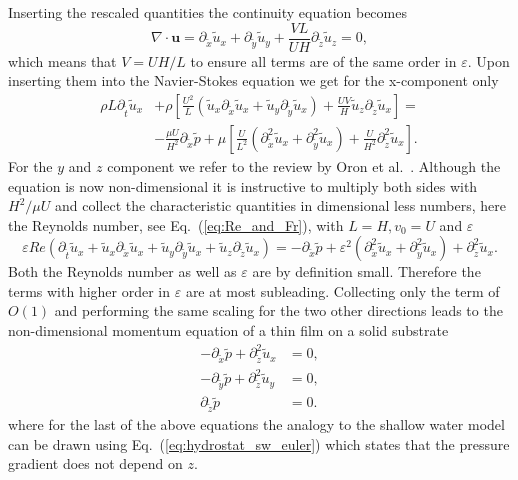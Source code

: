 Inserting the rescaled quantities the continuity equation becomes
\begin{equation}\label{eq:cont_thin_film_1}
     \nabla\cdot\mathbf{u} = \partial_{\tilde{x}} \tilde{u}_x + \partial_{\tilde{y}} \tilde{u}_y + \frac{V L}{U H}\partial_{\tilde{z}} \tilde{u}_z = 0,
\end{equation}
which means that $V = U H/L$ to ensure all terms are of the same order in $\varepsilon$.
Upon inserting them into the Navier-Stokes equation we get for the x-component only
\begin{align}
     \rho L \partial_{\tilde{t}}\tilde{u}_x &+ \rho\left[\frac{U^2}{L}\left(\tilde{u}_x\partial_{\tilde{x}}\tilde{u}_x + \tilde{u}_y\partial_{\tilde{y}}\tilde{u}_x\right) + \frac{U V}{H}\tilde{u}_z\partial_{\tilde{z}}\tilde{u}_x\right] = \nonumber \\ &-\frac{\mu U}{H^2} \partial_{\tilde{x}} \tilde{p} + \mu\left[\frac{U}{L^2}(\partial^2_{\tilde{x}}\tilde{u}_x + \partial^2_{\tilde{y}}\tilde{u}_x) + \frac{U}{H^2}\partial^2_{\tilde{z}}\tilde{u}_x\right].
\end{align}
For the $y$ and $z$ component we refer to the review by Oron et al.~\cite{RevModPhys.69.931}.
Although the equation is now non-dimensional it is instructive to multiply both sides with $H^2/\mu U$ and collect the characteristic quantities in dimensional less numbers, here the Reynolds number, see Eq.~(\ref{eq:Re_and_Fr}), with $L = H, v_0 = U$ and $\varepsilon$  
\begin{equation}
    \varepsilon Re \left(\partial_{\tilde{t}}\tilde{u}_x + \tilde{u}_x\partial_{\tilde{x}}\tilde{u}_x + \tilde{u}_y\partial_{\tilde{y}}\tilde{u}_x + \tilde{u}_z\partial_{\tilde{z}}\tilde{u}_x \right) = -\partial_{\tilde{x}}\tilde{p} + \varepsilon^2\left(\partial^2_{\tilde{x}}\tilde{u}_x + \partial^2_{\tilde{y}}\tilde{u}_x\right) + \partial^2_{\tilde{z}}\tilde{u}_x. 
\end{equation}
Both the Reynolds number as well as $\varepsilon$ are by definition small. 
Therefore the terms with higher order in $\varepsilon$ are at most subleading.
Collecting only the term of $O(1)$ and performing the same scaling for the two other directions leads to the non-dimensional momentum equation of a thin film on a solid substrate
\begin{align}
    -\partial_{\tilde{x}}\tilde{p} + \partial^2_{\tilde{z}}\tilde{u}_x &= 0,  \label{eq:thin_film_pressure_x}\\
    -\partial_{\tilde{y}}\tilde{p} + \partial^2_{\tilde{z}}\tilde{u}_y &= 0,  \label{eq:thin_film_pressure_y}\\
    \partial_{\tilde{z}}\tilde{p} &= 0. \label{eq:thin_film_pressure_z}
\end{align}
where for the last of the above equations the analogy to the shallow water model can be drawn using Eq.~(\ref{eq:hydrostat_sw_euler}) which states that the pressure gradient does not depend on $z$.
 
